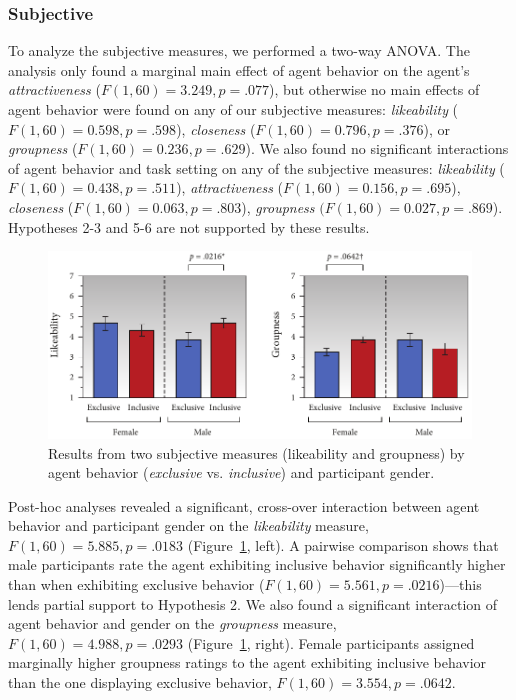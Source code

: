 \subsubsection{Subjective}

To analyze the subjective measures, we performed a two-way ANOVA. The analysis only found a marginal main effect of agent behavior on the agent's \emph{attractiveness} ($F(1, 60) = 3.249, p = .077$), but otherwise no main effects of agent behavior were found on any of our subjective measures: \emph{likeability} ($F(1, 60) = 0.598, p = .598$), \emph{closeness} ($F(1, 60) = 0.796, p = .376$), or \emph{groupness} ($F(1, 60) = 0.236, p = .629$). We also found no significant interactions of agent behavior and task setting on any of the subjective measures: \emph{likeability} ($F(1, 60) = 0.438, p = .511$), \emph{attractiveness} ($F(1, 60) = 0.156, p = .695$), \emph{closeness} ($F(1, 60) = 0.063, p = .803$), \emph{groupness} $(F(1, 60) = 0.027, p = .869$). Hypotheses 2-3 and 5-6 are not supported by these results.

\begin{figure}
\centering
\includegraphics[width=1\textwidth]{conversationalrolegaze/Figures/ResultsSubjectiveGender.pdf}
\caption{Results from two subjective measures (likeability and groupness) by agent behavior (\emph{exclusive} vs. \emph{inclusive}) and participant gender.}
\label{fig:GazeFootingSubjectiveGender}
\end{figure}

Post-hoc analyses revealed a significant, cross-over interaction between agent behavior and participant gender on the \emph{likeability} measure, $F(1, 60) = 5.885, p = .0183$ (Figure~\ref{fig:GazeFootingSubjectiveGender}, left). A pairwise comparison shows that male participants rate the agent exhibiting inclusive behavior significantly higher than when exhibiting exclusive behavior ($F(1, 60) = 5.561, p = .0216$)---this lends partial support to Hypothesis 2. We also found a significant interaction of agent behavior and gender on the \emph{groupness} measure, $F(1, 60) = 4.988, p = .0293$ (Figure~\ref{fig:GazeFootingSubjectiveGender}, right). Female participants assigned marginally higher groupness ratings to the agent exhibiting inclusive behavior than the one displaying exclusive behavior, $F(1, 60) = 3.554, p = .0642$.

